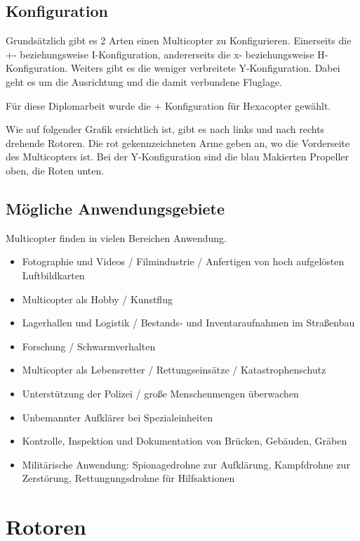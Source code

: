  \subsection{Konfiguration}
  Grundsätzlich gibt es 2 Arten einen Multicopter zu Konfigurieren. \cite{GrundlagenMulticopter}
  Einerseits die +- beziehungsweise I-Konfiguration, andererseits die x- beziehungsweise H-Konfiguration. Weiters gibt es die weniger verbreitete Y-Konfiguration. Dabei geht es um die Ausrichtung und die damit verbundene Fluglage.

  Für diese Diplomarbeit wurde die + Konfiguration für Hexacopter gewählt.

  Wie auf folgender Grafik ersichtlich ist, gibt es nach links und nach rechts drehende Rotoren. Die rot gekennzeichneten Arme geben an, wo die Vorderseite des Multicopters ist. Bei der Y-Konfiguration sind die blau Makierten Propeller oben, die Roten unten.


  \subsection{Mögliche Anwendungsgebiete}
  Multicopter finden in vielen Bereichen Anwendung. \cite{copterAnwendung}
  \begin{itemize}
    \item Fotographie und Videos / Filmindustrie / Anfertigen von hoch aufgelösten Luftbildkarten
    \item Multicopter als Hobby / Kunstflug
    \item Lagerhallen und Logistik / Bestands- und Inventaraufnahmen im Straßenbau
    \item Forschung / Schwarmverhalten
    \item Multicopter als Lebensretter / Rettungseinsätze / Katastrophenschutz
    \item Unterstützung der Polizei / große Menschenmengen überwachen
    \item Unbemannter Aufklärer bei Spezialeinheiten
    \item Kontrolle, Inspektion und Dokumentation von Brücken, Gebäuden, Gräben
    \item Militärische Anwendung: Spionagedrohne zur Aufklärung, Kampfdrohne zur Zerstörung, Rettungungsdrohne für Hilfsaktionen
  \end{itemize}


\section{Rotoren}

